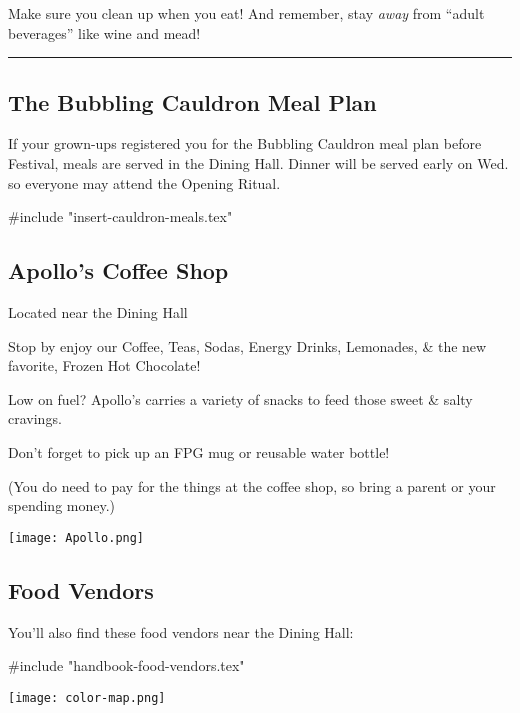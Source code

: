 \documentclass[9pt,twoside,openright,final,article,letterpaper]{memoir}
\renewcommand{\pfbreakdisplay}{%
  \needspace{24pt}%
  \vspace{8pt}\\\ding{76}\quad\ding{77}\quad\ding{78}\\%
  \vspace{11pt}}
\let\oldsubsection=\subsection
\renewcommand{\subsection}[1]{%
  \vspace{6pt}
  \needspace{1.25in}
  \oldsubsection{#1}
  \nopagebreak}
\begin{document}
\begin{multicols}{3}

  Make sure you clean up when you eat! And remember, stay \emph{away} from
  ``adult beverages'' like wine and mead!

  \fancybreak{\pfbreakdisplay}

  \subsection{The Bubbling Cauldron Meal Plan}

  If your grown-ups registered you for the Bubbling Cauldron meal plan
  before Festival, meals are served in the Dining Hall. {\small Dinner
    will be served early on Wed. so everyone may attend the
    Opening Ritual.}

  #include "insert-cauldron-meals.tex"


  \subsection{Apollo's Coffee Shop }

  {\small Located near the Dining Hall }

  Stop by enjoy our Coffee, Teas, Sodas, Energy Drinks, Lemonades, \&
  the new favorite, Frozen Hot Chocolate!

  Low on fuel? Apollo's carries a variety of snacks to feed those sweet
  \& salty cravings.

  Don't forget to pick up an FPG mug or reusable water bottle!

  (You do need to pay for the things at the coffee shop, so bring a
  parent or your spending money.)

  \vfill

  \begin{center}
    \texttt{[image: Apollo.png]}
  \end{center}


  \subsection{Food Vendors}

  You'll also find these food vendors near the Dining Hall:

  #include "handbook-food-vendors.tex"

\end{multicols}



\thispagestyle{headings}
\newpage
\pagestyle{empty}
\thispagestyle{empty}

\thispagestyle{empty}
\vfill
\texttt{[image: color-map.png]}
\vfill
\end{document}
